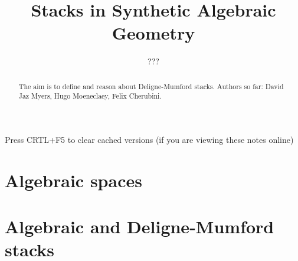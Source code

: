 \documentclass{../util/zariski}
\title{Stacks in Synthetic Algebraic Geometry}
\author{???}
\begin{document}
\maketitle

\begin{center}
  \color{purple}
  \large{Press CRTL+F5 to clear cached versions}
  \large{(if you are viewing these notes online)}
\end{center}

\begin{abstract}
  The aim is to define and reason about Deligne-Mumford stacks.
  Authors so far: David Jaz Myers, Hugo Moeneclaey, Felix Cherubini.
\end{abstract}

\tableofcontents

\section{Algebraic spaces}


\section{Algebraic and Deligne-Mumford stacks}


\printindex

\printbibliography
\end{document}

